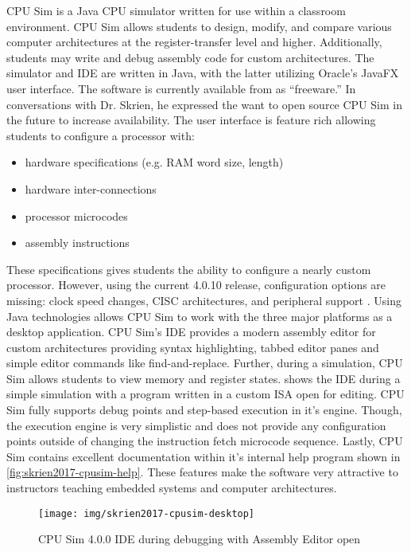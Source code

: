 CPU Sim is a Java CPU simulator written for use within a classroom environment\cite{Skrien2001}. CPU Sim allows students to design, modify, and compare various computer architectures at the register-transfer level and higher. Additionally, students may write and debug assembly code for custom architectures. The simulator and IDE are written in Java, with the latter utilizing Oracle's JavaFX user interface. The software is currently available from \cite{Skrien2017} as ``freeware.'' In conversations with Dr. Skrien, he expressed the want to open source CPU Sim in the future to increase availability\cite{Skrien2016}. The user interface is feature rich allowing students to configure a processor with:
\begin{itemize}
    \item hardware specifications (e.g. RAM word size, length)
    \item hardware inter-connections
    \item processor microcodes
    \item assembly instructions
\end{itemize} 
These specifications gives students the ability to configure a nearly custom processor. However, using the current 4.0.10 release, configuration options are missing: clock speed changes, CISC architectures, and peripheral support
\cite{Skrien2017}. Using Java technologies allows CPU Sim to work with the three major platforms as a desktop application. CPU Sim's IDE provides a modern assembly editor for custom architectures providing syntax highlighting, tabbed editor panes and simple editor commands like find-and-replace. Further, during a simulation, CPU Sim allows students to view memory and register states.  shows the IDE during a simple simulation with a program written in a custom ISA open for editing. CPU Sim fully supports debug points and step-based execution in it's engine. Though, the execution engine is very simplistic and does not provide any configuration points outside of changing the instruction fetch microcode sequence. Lastly, CPU Sim contains excellent documentation within it's internal help program shown in \cref{fig:skrien2017-cpusim-help}. These features make the software very attractive to instructors teaching embedded systems and computer architectures. 

\begin{figure}[t!]
    \centering
    \texttt{[image: img/skrien2017-cpusim-desktop]}
    \caption{CPU Sim 4.0.0 IDE during debugging with Assembly Editor open\cite{Skrien2017}}
    \label{fig:skrien2017-cpusim-desktop}
\end{figure}

